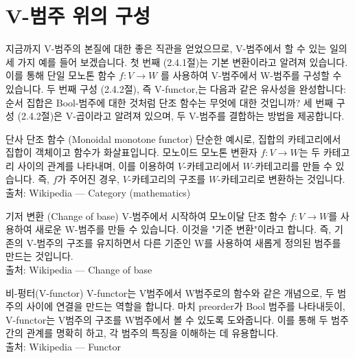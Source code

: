 \documentclass[11pt, a4paper, twoside, openany]{book}
\begin{document}
{\section{V-범주 위의 구성}
\label{sec:2-4}

지금까지 V-범주의 본질에 대한 좋은 직관을 얻었으므로, V-범주에서 할 수 있는 일의 세 가지 예를 들어 보겠습니다. 첫 번째 (2.4.1\hspace{0pt}절)는 기본 변환이라고 알려져 있습니다. 이를 통해 단일 모노톤 함수 $f:V\rightarrow W$ 를 사용하여 V-범주에서 W-범주를 구성할 수 있습니다. 두 번째 구성 (2.4.2\hspace{0pt}절), 즉 V-functor,는 다음과 같은 유사성을 완성합니다: 순서 집합은 Bool-범주에 대한 것처럼 단조 함수는 무엇에 대한 것입니까? 세 번째 구성 (2.4.2\hspace{0pt}절)은 V-곱이라고 알려져 있으며, 두 V-범주를 결합하는 방법을 제공합니다.

\begin{deepresearch}{단사 단조 함수 (Monoidal monotone functor)}
단순한 예시로, 집합의 카테고리에서 집합이 객체이고 함수가 화살표입니다.  모노이드 모노톤 변환자 $f : V \rightarrow W$는 두 카테고리 사이의 관계를 나타내며, 이를 이용하여 $V$-카테고리에서 $W$-카테고리를 만들 수 있습니다. 즉, $f$가 주어진 경우, $V$-카테고리의 구조를 $W$-카테고리로 변환하는 것입니다.
\\[4pt]{\footnotesize\color{ctgray} 출처: Wikipedia — Category (mathematics)}
\end{deepresearch}

\begin{deepresearch}{기저 변환 (Change of base)}
V-범주에서 시작하여 모노이달 단조 함수 $f : V \rightarrow W$를 사용하여 새로운 W-범주를 만들 수 있습니다. 이것을 "기준 변환"이라고 합니다. 즉, 기존의 V-범주의 구조를 유지하면서 다른 기준인 W\hspace{0pt}를 사용하여 새롭게 정의된 범주를 만드는 것입니다.
\\[4pt]{\footnotesize\color{ctgray} 출처: Wikipedia — Change of base}
\end{deepresearch}

\begin{deepresearch}{비-펑터(V-functor)}
V-functor\hspace{0pt}는 V\hspace{0pt}범주에서 W\hspace{0pt}범주로의 함수와 같은 개념으로,  두 범주의 사이에 연결을 만드는 역할을 합니다. 마치 preorder\hspace{0pt}가 Bool 범주를 나타내듯이, V-functor\hspace{0pt}는 V\hspace{0pt}범주의 구조를 W\hspace{0pt}범주에서 볼 수 있도록 도와줍니다. 이를 통해 두 범주 간의 관계를 명확히 하고, 각 범주의 특징을 이해하는 데 유용합니다.
\\[4pt]{\footnotesize\color{ctgray} 출처: Wikipedia — Functor}
\end{deepresearch}


}
\end{document}
